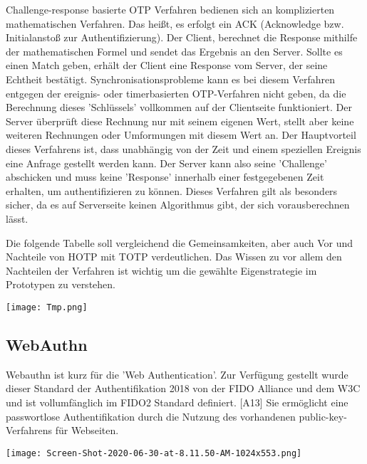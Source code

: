 Challenge-response basierte OTP Verfahren bedienen sich an komplizierten mathematischen Verfahren. Das heißt, es erfolgt ein ACK (Acknowledge bzw. Initialanstoß zur Authentifizierung). Der Client, berechnet die Response mithilfe der mathematischen Formel und sendet das Ergebnis an den Server. Sollte es einen Match geben, erhält der Client eine Response vom Server, der seine Echtheit bestätigt. Synchronisationsprobleme kann es bei diesem Verfahren entgegen der ereignis- oder timerbasierten OTP-Verfahren nicht geben, da die Berechnung dieses 'Schlüssels' vollkommen auf der Clientseite funktioniert. Der Server überprüft diese Rechnung nur mit seinem eigenen Wert, stellt aber keine weiteren Rechnungen oder Umformungen mit diesem Wert an. Der Hauptvorteil dieses Verfahrens ist, dass unabhängig von der Zeit und einem speziellen Ereignis eine Anfrage gestellt werden kann. Der Server kann also seine 'Challenge' abschicken und muss keine 'Response' innerhalb einer festgegebenen Zeit erhalten, um authentifizieren zu können. Dieses Verfahren gilt als besonders sicher, da es auf Serverseite keinen Algorithmus gibt, der sich vorausberechnen lässt.

Die folgende Tabelle soll vergleichend die Gemeinsamkeiten, aber auch Vor und Nachteile von HOTP mit TOTP verdeutlichen. Das Wissen zu vor allem den Nachteilen der Verfahren ist wichtig um die gewählte Eigenstrategie im Prototypen zu verstehen.

\texttt{[image: Tmp.png]}

\subsection{WebAuthn}
Webauthn ist kurz für die 'Web Authentication'. Zur Verfügung gestellt wurde dieser Standard der Authentifikation 2018 von der FIDO Alliance und dem W3C und ist vollumfänglich im FIDO2 Standard definiert. [A13] Sie ermöglicht eine passwortlose Authentifikation durch die Nutzung des vorhandenen public-key-Verfahrens für Webseiten.

\texttt{[image: Screen-Shot-2020-06-30-at-8.11.50-AM-1024x553.png]}

